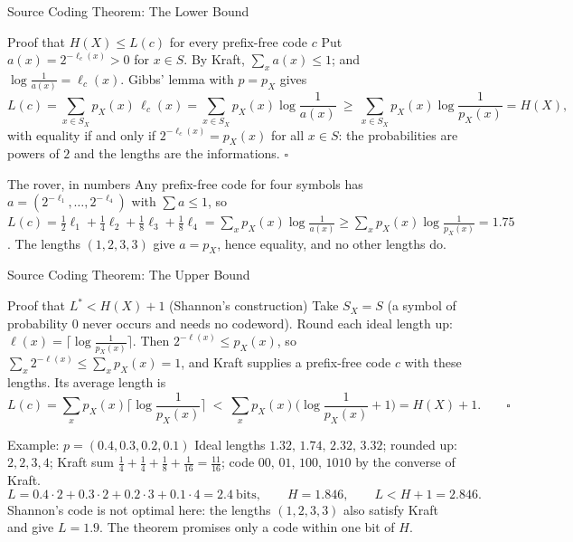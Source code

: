 \begin{frame}{Source Coding Theorem: The Lower Bound}
  \small
  \begin{block}{Proof that $H(X)\le L(c)$ for every prefix-free code $c$}
    Put $a(x)=2^{-\ell_c(x)}>0$ for $x\in S$. By Kraft, $\sum_xa(x)\le1$; and $\log\frac1{a(x)}=\ell_c(x)$. Gibbs' lemma with $p=p_X$ gives
    \[
      L(c)=\sum_{x\in S_X}p_X(x)\,\ell_c(x)=\sum_{x\in S_X}p_X(x)\log\frac1{a(x)}\ \ge\ \sum_{x\in S_X}p_X(x)\log\frac1{p_X(x)}=H(X),
    \]
    with equality if and only if $2^{-\ell_c(x)}=p_X(x)$ for all $x\in S$: the probabilities are powers of $2$ and the lengths are the informations. \hfill$\square$
  \end{block}
  \begin{exampleblock}{The rover, in numbers}
    Any prefix-free code for four symbols has $a=(2^{-\ell_1},\dots,2^{-\ell_4})$ with $\sum a\le1$, so
    $L(c)=\tfrac12\ell_1+\tfrac14\ell_2+\tfrac18\ell_3+\tfrac18\ell_4=\sum_xp_X(x)\log\tfrac1{a(x)}\ge\sum_xp_X(x)\log\tfrac1{p_X(x)}=1.75$.
    The lengths $(1,2,3,3)$ give $a=p_X$, hence equality, and no other lengths do.
  \end{exampleblock}
\end{frame}

\begin{frame}{Source Coding Theorem: The Upper Bound}
  \small
  \begin{block}{Proof that $L^*<H(X)+1$ (Shannon's construction)}
    Take $S_X=S$ (a symbol of probability $0$ never occurs and needs no codeword). Round each ideal length up: $\ell(x)=\lceil\log\tfrac1{p_X(x)}\rceil$. Then $2^{-\ell(x)}\le p_X(x)$, so
    $\sum_x2^{-\ell(x)}\le\sum_xp_X(x)=1$, and Kraft supplies a prefix-free code $c$ with these lengths. Its average length is
    \[
      L(c)=\sum_xp_X(x)\Big\lceil\log\frac1{p_X(x)}\Big\rceil\ <\ \sum_xp_X(x)\Big(\log\frac1{p_X(x)}+1\Big)=H(X)+1 .\qquad\square
    \]
  \end{block}
  \begin{exampleblock}{Example: $p=(0.4,0.3,0.2,0.1)$}
    Ideal lengths $1.32,\,1.74,\,2.32,\,3.32$; rounded up: $2,2,3,4$; Kraft sum $\tfrac14+\tfrac14+\tfrac18+\tfrac1{16}=\tfrac{11}{16}$; code $00,\,01,\,100,\,1010$ by the converse of Kraft.
    \[
      L=0.4\cdot2+0.3\cdot2+0.2\cdot3+0.1\cdot4=2.4\ \text{bits},\qquad H=1.846,\qquad L<H+1=2.846 .
    \]
    Shannon's code is not optimal here: the lengths $(1,2,3,3)$ also satisfy Kraft and give $L=1.9$. The theorem promises only a code within one bit of $H$.
  \end{exampleblock}
\end{frame}


